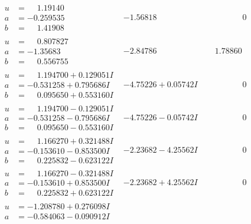 \documentclass[1p]{elsarticle_modified}
\theoremstyle{definition}
\begin{document}
$$\begin{array}{c|c|c}
\begin{aligned}
u &= \phantom{-}1.19140\phantom{ +0.000000I} \\
a &= -0.259535\phantom{ +0.000000I} \\
b &= \phantom{-}1.41908\phantom{ +0.000000I}\end{aligned}
 & -1.56818\phantom{ +0.000000I} & \phantom{-0.000000 } 0 \\ \hline\begin{aligned}
u &= \phantom{-}0.807827\phantom{ +0.000000I} \\
a &= -1.35683\phantom{ +0.000000I} \\
b &= \phantom{-}0.556755\phantom{ +0.000000I}\end{aligned}
 & -2.84786\phantom{ +0.000000I} & \phantom{-}1.78860\phantom{ +0.000000I} \\ \hline\begin{aligned}
u &= \phantom{-}1.194700 + 0.129051 I \\
a &= -0.531258 + 0.795686 I \\
b &= \phantom{-}0.095650 + 0.553160 I\end{aligned}
 & -4.75226 + 0.05742 I & \phantom{-0.000000 } 0 \\ \hline\begin{aligned}
u &= \phantom{-}1.194700 - 0.129051 I \\
a &= -0.531258 - 0.795686 I \\
b &= \phantom{-}0.095650 - 0.553160 I\end{aligned}
 & -4.75226 - 0.05742 I & \phantom{-0.000000 } 0 \\ \hline\begin{aligned}
u &= \phantom{-}1.166270 + 0.321488 I \\
a &= -0.153610 - 0.853500 I \\
b &= \phantom{-}0.225832 - 0.623122 I\end{aligned}
 & -2.23682 - 4.25562 I & \phantom{-0.000000 } 0 \\ \hline\begin{aligned}
u &= \phantom{-}1.166270 - 0.321488 I \\
a &= -0.153610 + 0.853500 I \\
b &= \phantom{-}0.225832 + 0.623122 I\end{aligned}
 & -2.23682 + 4.25562 I & \phantom{-0.000000 } 0 \\ \hline\begin{aligned}
u &= -1.208780 + 0.276098 I \\
a &= -0.584063 - 0.090912 I \\

\end{aligned}
\end{array}$$
\end{document}
